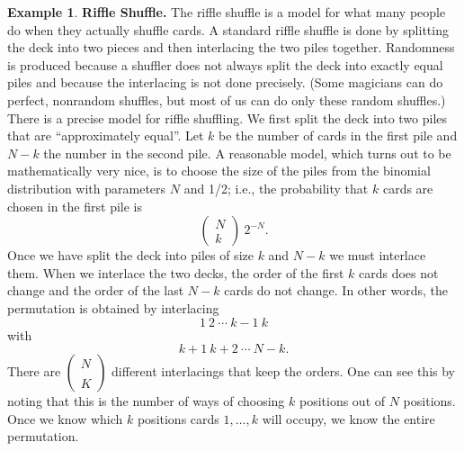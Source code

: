 \documentclass{stml-l}
\theoremstyle{definition}
\newtheorem{example}{Example}
\numberwithin{equation}{chapter}
\numberwithin{figure}{chapter}
\numberwithin{figure}{section}
\begin{document}
\begin{example}\label{ch05:exa5} \textbf{Riffle Shuffle.} The riffle shuffle is a model for what many people do when they actually shuffle cards. A standard riffle shuffle is done by splitting the deck into two pieces and then interlacing the two piles together. Randomness is produced because a shuffler does not always split the deck into exactly equal piles and because the interlacing is not done precisely. (Some magicians can do perfect, nonrandom shuffles, but most of us can do only these random shuffles.) There is a precise model for riffle shuffling. We first split the deck into two piles that are ``approximately equal''. Let $k$ be the number of cards in the first pile and $N-k$ the number in the second pile. A reasonable model, which turns out to be mathematically very nice, is to choose the size of the piles from the binomial distribution with parameters $N$ and 1/2; i.e., the probability that $k$ cards are chosen in the first pile is
\begin{equation*}
\left(\begin{array}{l}
N\\
k
\end{array}\right)\ 2^{-N}.
\end{equation*}
Once we have split the deck into piles of size $k$ and $N-k$ we must interlace them. When we interlace the two decks, the order of the first $k$ cards does not change and the order of the last $N-k$ cards do not change. In other words, the permutation is obtained by interlacing
\begin{equation*}
1\ 2\ \cdots\ k-1\ k
\end{equation*}
with
\begin{equation*}
k+1\ k+2\ \cdots\ N-k.
\end{equation*}
There are $\left(\substack{N\\\\K}\right)$ different interlacings that keep the orders. One can see this by noting that this is the number of ways of choosing $k$ positions out of $N$ positions. Once we know which $k$ positions cards $1,\ldots,k$ will occupy, we know the entire permutation.


\end{example}
\end{document}
